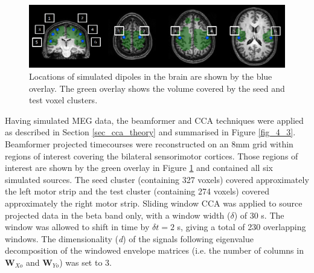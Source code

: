 \begin{figure}[h]
	\includegraphics[width=\linewidth]{./images/chapter4/figure_2.png}\caption{Locations of simulated dipoles in the brain are shown by the blue overlay. The green overlay shows the volume covered by the seed and test voxel clusters.}\label{fig_4_2}
\end{figure}

Having simulated MEG data, the beamformer and CCA techniques were applied as described in Section \ref{sec_cca_theory} and summarised in Figure \ref{fig_4_3}. Beamformer projected timecourses were reconstructed on an 8mm grid within regions of interest covering the bilateral sensorimotor cortices. Those regions of interest are shown by the green overlay in Figure \ref{fig_4_2} and contained all six simulated sources. The seed cluster (containing 327 voxels) covered approximately the left motor strip and the test cluster (containing 274 voxels) covered approximately the right motor strip. Sliding window CCA was applied to source projected data in the beta band only, with a window width ($\delta$) of 30 s. The window was allowed to shift in time by $\delta t = 2$ s, giving a total of 230 overlapping windows. The dimensionality (\textit{d}) of the signals following eigenvalue decomposition of the windowed envelope matrices (i.e. the number of columns in $\mathbf{W}_{Xo}$ and $\mathbf{W}_{Yo}$) was set to 3.

